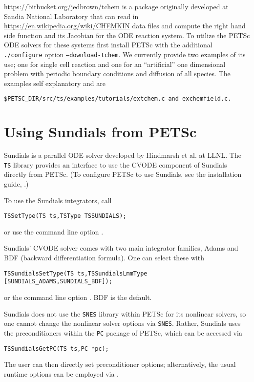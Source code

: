 \url{https://bitbucket.org/jedbrown/tchem} is a package originally developed at Sandia National Laboratory that can read in
\url{https://en.wikipedia.org/wiki/CHEMKIN} data files and compute the right hand side function and its Jacobian for the ODE reaction system.
To utilize the PETSc ODE solvers for these systems first install PETSc with the additional {\tt ./configure} 
 option {\tt --download-tchem}. We currently provide two examples of its use; one for single cell reaction and one for an ``artificial''
one dimensional problem with periodic boundary conditions and diffusion of all species. The examples self explanatory and are {\tt \$PETSC\_DIR/src/ts/examples/tutorials/extchem.c and exchemfield.c.


\section{Using Sundials from PETSc}
\label{sec_sundials}

Sundials is a parallel ODE solver developed by Hindmarsh et al. at
LLNL.  The \lstinline{TS} library provides an interface to use the
CVODE component of Sundials directly from PETSc.  (To configure PETSc
to use Sundials, see the installation
guide, .)

To use the Sundials integrators, call
\begin{lstlisting}
TSSetType(TS ts,TSType TSSUNDIALS);
\end{lstlisting}
or use the command line option  .
  

Sundials' CVODE solver comes with two main integrator families, Adams
and BDF (backward differentiation formula). One can select these with
\begin{lstlisting}
TSSundialsSetType(TS ts,TSSundialsLmmType [SUNDIALS_ADAMS,SUNDIALS_BDF]);
\end{lstlisting}
or the command line option . BDF is
the default. 
 

Sundials does not use the \lstinline{SNES} library within PETSc for its nonlinear
solvers, so one cannot change the nonlinear solver options via
\lstinline{SNES}. Rather, Sundials uses the preconditioners within the \lstinline{PC} package
of PETSc, which can be accessed via
\begin{lstlisting}
TSSundialsGetPC(TS ts,PC *pc);
\end{lstlisting}
The user can then directly set preconditioner options;
alternatively, the usual runtime options can be employed
via .

}

